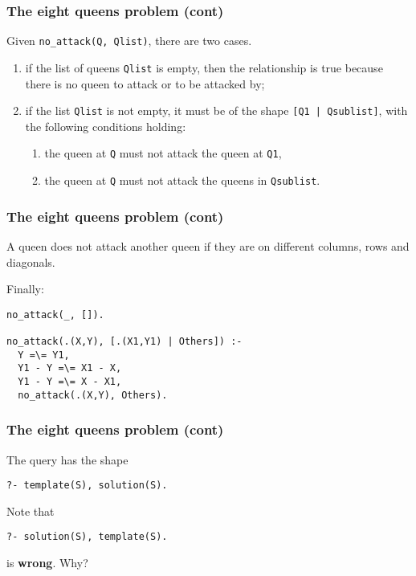 %
\begin{frame}
\frametitle{The eight queens problem (cont)}

Given \texttt{no\_attack(Q, Qlist)}, there are two cases.
\begin{enumerate}

  \item if the list of queens \texttt{Qlist} is empty, then the
    relationship is true because there is no queen to attack or to be
    attacked by;

  \item if the list \texttt{Qlist} is not empty, it must be of the
    shape \texttt{[Q1 | Qsublist]}, with the following conditions
    holding:
    \begin{enumerate}

      \item the queen at \texttt{Q} must not attack the queen at
        \texttt{Q1},

      \item the queen at \texttt{Q} must not attack the queens in
        \texttt{Qsublist}.

    \end{enumerate}

\end{enumerate}

\end{frame}

%
\begin{frame}[containsverbatim]
\frametitle{The eight queens problem (cont)}

A queen does not attack another queen if they are on different
columns, rows and diagonals. 

\bigskip

Finally:
{\small
\begin{verbatim}
no_attack(_, []).

no_attack(.(X,Y), [.(X1,Y1) | Others]) :-
  Y =\= Y1,
  Y1 - Y =\= X1 - X,
  Y1 - Y =\= X - X1,
  no_attack(.(X,Y), Others).
\end{verbatim}
}

\end{frame}

%
\begin{frame}[containsverbatim]
\frametitle{The eight queens problem (cont)}

The query has the shape
{\small
\begin{verbatim}
?- template(S), solution(S).
\end{verbatim}
}

\bigskip

Note that 
{\small
\begin{verbatim}
?- solution(S), template(S).
\end{verbatim}
}
is \textbf{wrong}. Why?

\end{frame}
